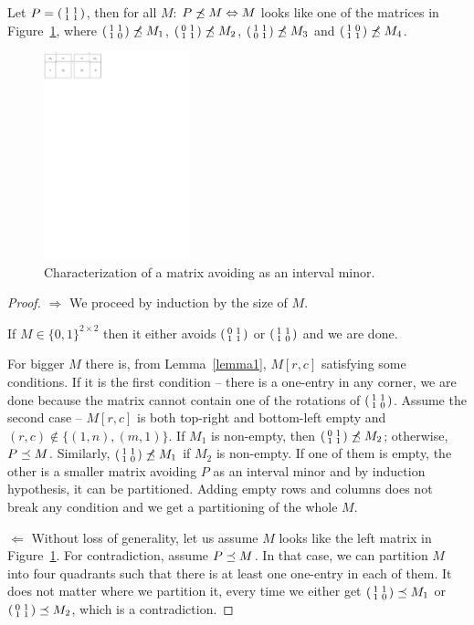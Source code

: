 \begin{thm}
\label{t33}
Let $P=\left(\begin{smallmatrix}1&1\\1&1\end{smallmatrix}\right)$, then for all $M$: $P\not\preceq M\Leftrightarrow M$ looks like one of the matrices in Figure~\ref{p33}, where $\left(\begin{smallmatrix}1&1\\1&0\end{smallmatrix}\right)\not\preceq M_1$, $\left(\begin{smallmatrix}0&1\\1&1\end{smallmatrix}\right)\not\preceq M_2$, $\left(\begin{smallmatrix}1&1\\0&1\end{smallmatrix}\right)\not\preceq M_3$ and $\left(\begin{smallmatrix}1&0\\1&1\end{smallmatrix}\right)\not\preceq M_4$.
\end{thm}
\begin{figure}[h!]
\centering
\includegraphics[height=60mm]{img/p33.pdf}
\caption{Characterization of a matrix avoiding \usebox{\smlmatb} as an interval minor.}
\label{p33}
\end{figure}
\begin{proof}
\item[$\Rightarrow$] We proceed by induction by the size of $M$.

If $M\in\{0,1\}^{2\times2}$ then it either avoids $\left(\begin{smallmatrix}0&1\\1&1\end{smallmatrix}\right)$ or $\left(\begin{smallmatrix}1&1\\1&0\end{smallmatrix}\right)$ and we are done.

For bigger $M$ there is, from Lemma~\ref{lemma1}, $M[r,c]$ satisfying some conditions. If it is the first condition -- there is a one-entry in any corner, we are done because the matrix cannot contain one of the rotations of $\left(\begin{smallmatrix}1&1\\1&0\end{smallmatrix}\right)$. Assume the second case -- $M[r,c]$ is both top-right and bottom-left empty and $(r,c)\not\in\{(1,n),(m,1)\}$. If $M_1$ is non-empty, then $\left(\begin{smallmatrix}0&1\\1&1\end{smallmatrix}\right)\not\preceq M_2$; otherwise, $P\preceq M$. Similarly, $\left(\begin{smallmatrix}1&1\\1&0\end{smallmatrix}\right)\not\preceq M_1$ if $M_2$ is non-empty. If one of them is empty, the other is a smaller matrix avoiding $P$ as an interval minor and by induction hypothesis, it can be partitioned. Adding empty rows and columns does not break any condition and we get a partitioning of the whole $M$.
\item[$\Leftarrow$] Without loss of generality, let us assume $M$ looks like the left matrix in Figure~\ref{p33}. For contradiction, assume $P\preceq M$. In that case, we can partition $M$ into four quadrants such that there is at least one one-entry in each of them. It does not matter where we partition it, every time we either get $\left(\begin{smallmatrix}1&1\\1&0\end{smallmatrix}\right)\preceq M_1$ or $\left(\begin{smallmatrix}0&1\\1&1\end{smallmatrix}\right)\preceq M_2$, which is a contradiction.
\end{proof}

